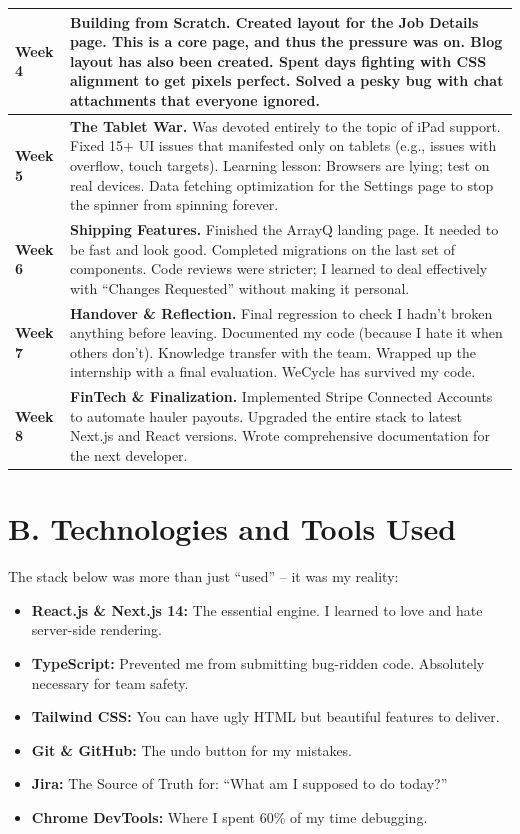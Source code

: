 \begin{longtable}{|p{2cm}|p{13cm}|}
\textbf{Week 4} & \textbf{Building from Scratch.} Created layout for the Job Details page. This is a core page, and thus the pressure was on. Blog layout has also been created. Spent days fighting with CSS alignment to get pixels perfect. Solved a pesky bug with chat attachments that everyone ignored. \\
\hline

\textbf{Week 5} & \textbf{The Tablet War.} Was devoted entirely to the topic of iPad support. Fixed 15+ UI issues that manifested only on tablets (e.g., issues with overflow, touch targets). Learning lesson: Browsers are lying; test on real devices. Data fetching optimization for the Settings page to stop the spinner from spinning forever. \\
\hline

\textbf{Week 6} & \textbf{Shipping Features.} Finished the ArrayQ landing page. It needed to be fast and look good. Completed migrations on the last set of components. Code reviews were stricter; I learned to deal effectively with ``Changes Requested'' without making it personal. \\
\hline

\textbf{Week 7} & \textbf{Handover \& Reflection.} Final regression to check I hadn't broken anything before leaving. Documented my code (because I hate it when others don't). Knowledge transfer with the team. Wrapped up the internship with a final evaluation. WeCycle has survived my code. \\
\hline

\textbf{Week 8} & \textbf{FinTech \& Finalization.} Implemented Stripe Connected Accounts to automate hauler payouts. Upgraded the entire stack to latest Next.js and React versions. Wrote comprehensive documentation for the next developer. \\
\hline
\end{longtable}

\section*{B. Technologies and Tools Used}
\par The stack below was more than just ``used'' – it was my reality:
\begin{itemize}
    \item \textbf{React.js \& Next.js 14:} The essential engine. I learned to love and hate server-side rendering.
    \item \textbf{TypeScript:} Prevented me from submitting bug-ridden code. Absolutely necessary for team safety.
    \item \textbf{Tailwind CSS:} You can have ugly HTML but beautiful features to deliver.
    \item \textbf{Git \& GitHub:} The undo button for my mistakes.
    \item \textbf{Jira:} The Source of Truth for: ``What am I supposed to do today?''
    \item \textbf{Chrome DevTools:} Where I spent 60\% of my time debugging.
\end{itemize}

